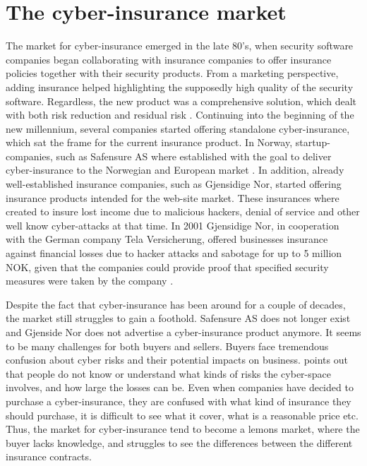 \section{The cyber-insurance market}

The market for cyber-insurance emerged in the late 80's, when security software companies began collaborating with insurance companies to offer insurance policies together with their security products. From a marketing perspective, adding insurance helped highlighting the supposedly high quality of the security software. Regardless, the new product was a comprehensive solution, which dealt with both risk reduction and residual risk \cite{bolot2008new}. Continuing into the beginning of the new millennium, several companies started offering standalone cyber-insurance, which sat the frame for the current insurance product. In Norway, startup-companies, such as Safensure AS where established with the goal to deliver cyber-insurance to the Norwegian and European market \cite{digi}. In addition, already well-established insurance companies, such as Gjensidige Nor, started offering insurance products intended for the web-site market. These insurances where created to insure lost income due to malicious hackers, denial of service and other well know cyber-attacks at that time. In 2001 Gjensidige Nor, in cooperation with the German company Tela Versicherung, offered businesses insurance against financial losses due to hacker attacks and sabotage for up to 5 million NOK, given that the companies could provide proof that specified security measures were taken by the company \cite{dagensithackerforsikring}. 
 

Despite the fact that cyber-insurance has been around for a couple of decades, the market still struggles to gain a foothold. Safensure AS does not longer exist and Gjenside Nor does not advertise a cyber-insurance product anymore. It seems to be many challenges for both buyers and sellers. Buyers face tremendous confusion about cyber risks and their potential impacts on business. 
\cite{Cyberworkshop} points out that people do not know or understand what kinds of risks the cyber-space involves, and how large the losses can be. Even when companies have decided to purchase a cyber-insurance, they are confused with what kind of insurance they should purchase, it is difficult to see what it cover, what is a reasonable price etc. Thus, the market for cyber-insurance tend to become a lemons market, where the buyer lacks knowledge, and struggles to see the differences between the different insurance contracts.


